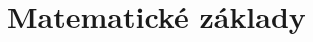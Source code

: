 \newpage
{}
{
	\section{Matematické základy}\label{sec:matematicke_zaklady}
	

    \newpage
    \clearpage 
 	
}
{
}


% 
